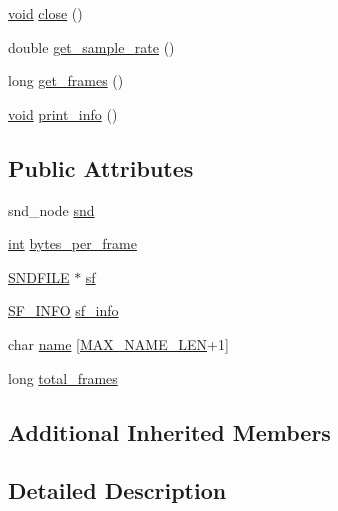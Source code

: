 \begin{DoxyCompactItemize}
\item 
\hyperlink{sound_8c_ae35f5844602719cf66324f4de2a658b3}{void} \hyperlink{class_audio__file__reader_aec7170b0fa8d0d41a7f3251ab6cbbf37}{close} ()
\item 
double \hyperlink{class_audio__file__reader_aaabf69bfa40d71459577eeaee049b78c}{get\+\_\+sample\+\_\+rate} ()
\item 
long \hyperlink{class_audio__file__reader_aa2f1a8ca4f0f22c5ba22383ef5edf383}{get\+\_\+frames} ()
\item 
\hyperlink{sound_8c_ae35f5844602719cf66324f4de2a658b3}{void} \hyperlink{class_audio__file__reader_a621f6c2b9488d30b7c6bf51b6c67ffde}{print\+\_\+info} ()
\end{DoxyCompactItemize}
\subsection*{Public Attributes}
\begin{DoxyCompactItemize}
\item 
snd\+\_\+node \hyperlink{class_audio__file__reader_a635812c920d380ed1c699a0d9ca003ce}{snd}
\item 
\hyperlink{xmltok_8h_a5a0d4a5641ce434f1d23533f2b2e6653}{int} \hyperlink{class_audio__file__reader_a61b1c3c92febe3a8f4030e0fa66b4106}{bytes\+\_\+per\+\_\+frame}
\item 
\hyperlink{mac_2config_2i386_2lib-src_2libsndfile_2src_2sndfile_8h_ac14209bc83d532b06a8cdf9ade6d544a}{S\+N\+D\+F\+I\+LE} $\ast$ \hyperlink{class_audio__file__reader_a09686628785daa65c278299282731b30}{sf}
\item 
\hyperlink{struct_s_f___i_n_f_o}{S\+F\+\_\+\+I\+N\+FO} \hyperlink{class_audio__file__reader_ae619b74b4da49881193e10580be026b6}{sf\+\_\+info}
\item 
char \hyperlink{class_audio__file__reader_ac2b48e388075405ac91bdcdfee78a2c9}{name} \mbox{[}\hyperlink{audiofilereader_8h_afd709f201d7643c3909621f620ea648a}{M\+A\+X\+\_\+\+N\+A\+M\+E\+\_\+\+L\+EN}+1\mbox{]}
\item 
long \hyperlink{class_audio__file__reader_ae8e5c2ab253c670ae5fa5a7d0b6980c5}{total\+\_\+frames}
\end{DoxyCompactItemize}
\subsection*{Additional Inherited Members}


\subsection{Detailed Description}


